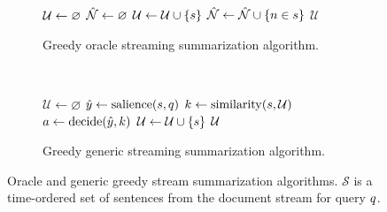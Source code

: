 \begin{figure}
\begin{subfigure}{.47\textwidth}
\begin{algorithmic}[1] 
  \State $\mathcal{U} \gets \varnothing$ 
  \State $\hat{\mathcal{N}} \gets \varnothing$ 
  \For{$\strsent \in \strsents$} 
      \State $\mathcal{U} \gets \mathcal{U} \cup \{s\}$ 
      \State $\hat{\mathcal{N}} \gets \hat{\mathcal{N}} \cup \{n \in s\}$ 
    \EndIf
  \EndFor
  \State \Return $\mathcal{U}$
\EndProcedure
\end{algorithmic}
    \caption{Greedy oracle streaming summarization algorithm.}
    \label{alg:ts_greedy_oracle}
\end{subfigure}
~
\begin{subfigure}{.48\textwidth}
\begin{algorithmic}[1] 

  \State $\mathcal{U} \gets \varnothing$ 
    \State $\hat{y} \gets \operatorname{salience}(s, q) $
    \State $k \gets \operatorname{similarity}(s, \mathcal{U})$
    \State $a \gets \operatorname{decide}(\hat{y}, k)$
        \State $\mathcal{U} \gets \mathcal{U} \cup \{s\}$
    \EndIf
  \EndFor
  \State \Return $\mathcal{U}$
\EndProcedure
\end{algorithmic}
    \caption{Greedy generic streaming summarization algorithm.}
    \label{alg:ts_greedy_generic}
\end{subfigure}
\caption{Oracle and generic greedy stream summarization algorithms. 
$\mathcal{S}$ is a time-ordered set of sentences from the document stream 
for query $q$.}
\end{figure}


